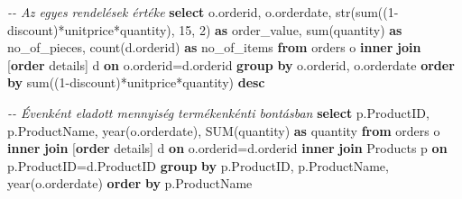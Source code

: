 \documentclass[
  magyar,
]{article}
\newenvironment{Shaded}{}{}
\newcommand{\CommentTok}[1]{\textcolor[rgb]{0.38,0.63,0.69}{\textit{#1}}}
\newcommand{\DataTypeTok}[1]{\textcolor[rgb]{0.56,0.13,0.00}{#1}}
\newcommand{\DecValTok}[1]{\textcolor[rgb]{0.25,0.63,0.44}{#1}}
\newcommand{\FunctionTok}[1]{\textcolor[rgb]{0.02,0.16,0.49}{#1}}
\newcommand{\KeywordTok}[1]{\textcolor[rgb]{0.00,0.44,0.13}{\textbf{#1}}}
\newcommand{\NormalTok}[1]{#1}
\newcommand{\OperatorTok}[1]{\textcolor[rgb]{0.40,0.40,0.40}{#1}}
\begin{document}
\begin{Shaded}
\begin{Highlighting}[]
\CommentTok{{-}{-} Az egyes rendelések értéke}
\KeywordTok{select}\NormalTok{ o.orderid, o.orderdate,}
\NormalTok{  str(}\FunctionTok{sum}\NormalTok{((}\DecValTok{1}\OperatorTok{{-}}\NormalTok{discount)}\OperatorTok{*}\NormalTok{unitprice}\OperatorTok{*}\NormalTok{quantity), }\DecValTok{15}\NormalTok{, }\DecValTok{2}\NormalTok{) }\KeywordTok{as}\NormalTok{ order\_value,}
  \FunctionTok{sum}\NormalTok{(quantity) }\KeywordTok{as}\NormalTok{ no\_of\_pieces,}
  \FunctionTok{count}\NormalTok{(d.orderid) }\KeywordTok{as}\NormalTok{ no\_of\_items}
\KeywordTok{from}\NormalTok{ orders o }\KeywordTok{inner} \KeywordTok{join}\NormalTok{ [}\KeywordTok{order}\NormalTok{ details] d }\KeywordTok{on}\NormalTok{ o.orderid}\OperatorTok{=}\NormalTok{d.orderid}
\KeywordTok{group} \KeywordTok{by}\NormalTok{ o.orderid, o.orderdate}
\KeywordTok{order} \KeywordTok{by} \FunctionTok{sum}\NormalTok{((}\DecValTok{1}\OperatorTok{{-}}\NormalTok{discount)}\OperatorTok{*}\NormalTok{unitprice}\OperatorTok{*}\NormalTok{quantity) }\KeywordTok{desc}

\CommentTok{{-}{-} Évenként eladott mennyiség termékenkénti bontásban}
\KeywordTok{select}\NormalTok{ p.ProductID, p.ProductName, }\DataTypeTok{year}\NormalTok{(o.orderdate), }\FunctionTok{SUM}\NormalTok{(quantity) }\KeywordTok{as}\NormalTok{ quantity}
\KeywordTok{from}\NormalTok{ orders o }\KeywordTok{inner} \KeywordTok{join}\NormalTok{ [}\KeywordTok{order}\NormalTok{ details] d }\KeywordTok{on}\NormalTok{ o.orderid}\OperatorTok{=}\NormalTok{d.orderid}
\KeywordTok{inner} \KeywordTok{join}\NormalTok{ Products p }\KeywordTok{on}\NormalTok{ p.ProductID}\OperatorTok{=}\NormalTok{d.ProductID}
\KeywordTok{group} \KeywordTok{by}\NormalTok{ p.ProductID, p.ProductName, }\DataTypeTok{year}\NormalTok{(o.orderdate)}
\KeywordTok{order} \KeywordTok{by}\NormalTok{ p.ProductName}


\end{Highlighting}
\end{Shaded}
\end{document}
